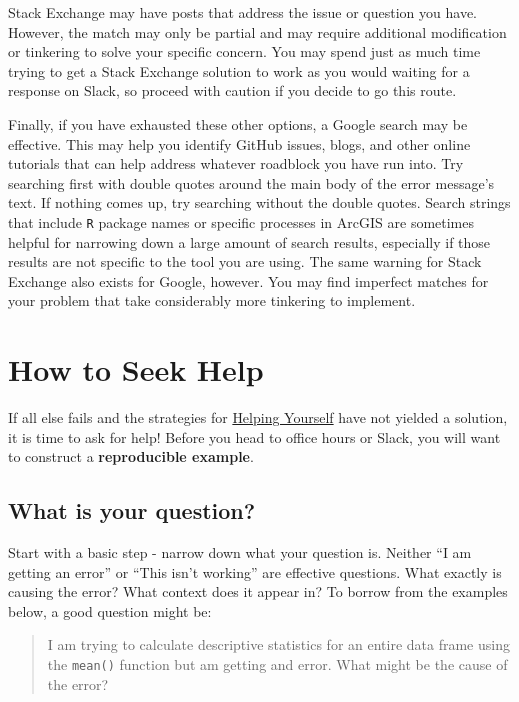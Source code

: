 \documentclass[]{book}
\theoremstyle{definition}
\theoremstyle{definition}
\theoremstyle{definition}
\theoremstyle{remark}
\begin{document}
Stack Exchange may have posts that address the issue or question you
have. However, the match may only be partial and may require additional
modification or tinkering to solve your specific concern. You may spend
just as much time trying to get a Stack Exchange solution to work as you
would waiting for a response on Slack, so proceed with caution if you
decide to go this route.

Finally, if you have exhausted these other options, a Google search may
be effective. This may help you identify GitHub issues, blogs, and other
online tutorials that can help address whatever roadblock you have run
into. Try searching first with double quotes around the main body of the
error message's text. If nothing comes up, try searching without the
double quotes. Search strings that include \texttt{R} package names or
specific processes in ArcGIS are sometimes helpful for narrowing down a
large amount of search results, especially if those results are not
specific to the tool you are using. The same warning for Stack Exchange
also exists for Google, however. You may find imperfect matches for your
problem that take considerably more tinkering to implement.

\hypertarget{how-to-seek-help}{\section{How to Seek
Help}\label{how-to-seek-help}}

If all else fails and the strategies for
\protect\hyperlink{helping-yourself}{Helping Yourself} have not yielded
a solution, it is time to ask for help! Before you head to office hours
or Slack, you will want to construct a \textbf{reproducible example}.

\subsection{What is your question?}\label{what-is-your-question}

Start with a basic step - narrow down what your question is. Neither ``I
am getting an error'' or ``This isn't working'' are effective questions.
What exactly is causing the error? What context does it appear in? To
borrow from the examples below, a good question might be:

\begin{quote}
I am trying to calculate descriptive statistics for an entire data frame
using the \texttt{mean()} function but am getting and error. What might
be the cause of the error?
\end{quote}
\end{document}
